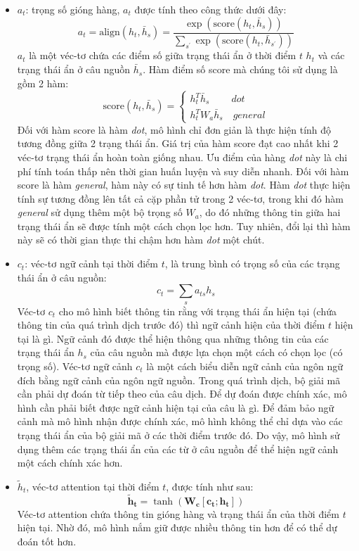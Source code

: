 \begin{itemize}
	\item $a_t$: trọng số gióng hàng, $a_t$ được tính theo công thức dưới đây:
	\begin{equation}
	a_t = \text{align}(h_t, \bar{h}_s) = \frac{\exp\left(\text{score}(h_t, \bar{h}_s)\right)}{\sum_{s^{'}}\exp\left(\text{score}(h_t, \bar{h}_{s^{'}})\right)}
	\end{equation}
	$a_t$ là một véc-tơ chứa các điểm số giữa trạng thái ẩn ở thời điểm $t$ $h_t$ và các trạng thái ẩn ở câu nguồn $\bar{h}_s$. Hàm điểm số score mà chúng tôi sử dụng là gồm 2 hàm:
	\begin{equation}
	\text{score}(h_t, \bar{h}_s) = \left\{
			\begin{array}{ll}
			h^T_t\bar{h}_s \ \quad\quad dot\\
			h^T_tW_a\bar{h}_s	\quad general
			\end{array}
		\right.
	\end{equation}
	Đối với hàm score là hàm \textit{dot}, mô hình chỉ đơn giản là thực hiện tính độ tương đồng giữa 2 trạng thái ẩn. Giá trị của hàm score đạt cao nhất khi 2 véc-tơ trạng thái ẩn hoàn toàn giống nhau. Ưu điểm của hàng \textit{dot} này là chi phí tính toán thấp nên thời gian huấn luyện và suy diễn nhanh.
	Đối với hàm score là hàm \textit{general}, hàm này có sự tinh tế hơn hàm \textit{dot}. Hàm \textit{dot} thực hiện tính sự tương đồng lên tất cả cặp phần tử trong 2 véc-tơ, trong khi đó hàm \textit{general} sử dụng thêm một bộ trọng số $W_a$, do đó những thông tin giữa hai trạng thái ẩn sẽ được tính một cách chọn lọc hơn. Tuy nhiên, đổi lại thì hàm này sẽ có thời gian thực thi chậm hơn hàm \textit{dot} một chút.
	\item $c_t$: véc-tơ ngữ cảnh tại thời điểm $t$, là trung bình có trọng số của các trạng thái ẩn ở câu nguồn:
	\begin{equation}
	c_t = \sum_{s}a_{ts}h_s
	\end{equation}
	Véc-tơ $c_t$ cho mô hình biết thông tin rằng với trạng thái ẩn hiện tại (chứa thông tin của quá trình dịch trước đó) thì ngữ cảnh hiện của thời điểm $t$ hiện tại là gì. Ngữ cảnh đó được thể hiện thông qua những thông tin của các trạng thái ẩn $h_s$ của câu nguồn mà được lựa chọn một cách có chọn lọc (có trọng số). Véc-tơ ngữ cảnh $c_t$ là một cách biểu diễn ngữ cảnh của ngôn ngữ đích bằng ngữ cảnh của ngôn ngữ nguồn. Trong quá trình dịch, bộ giải mã cần phải dự đoán từ tiếp theo của câu dịch. Để dự đoán được chính xác, mô hình cần phải biết được ngữ cảnh hiện tại của câu là gì. Để đảm bảo ngữ cảnh mà mô hình nhận được chính xác, mô hình không thể chỉ dựa vào các trạng thái ẩn của bộ giải mã ở các thời điểm trước đó. Do vậy, mô hình sử dụng thêm các trạng thái ẩn của các từ ở câu nguồn để thể hiện ngữ cảnh một cách chính xác hơn.
	\item $\tilde{h}_t$, véc-tơ attention tại thời điểm $t$, được tính như sau:
	\begin{equation}
	\boldsymbol{\tilde{h}_t} = \tanh(\bm{W_c}[\bm{c_t};\bm{h_t}])
	\end{equation}
	Véc-tơ attention chứa thông tin gióng hàng và trạng thái ẩn của thời điểm $t$ hiện tại. Nhờ đó, mô hình nắm giữ được nhiều thông tin hơn để có thể dự đoán tốt hơn.
\end{itemize}
